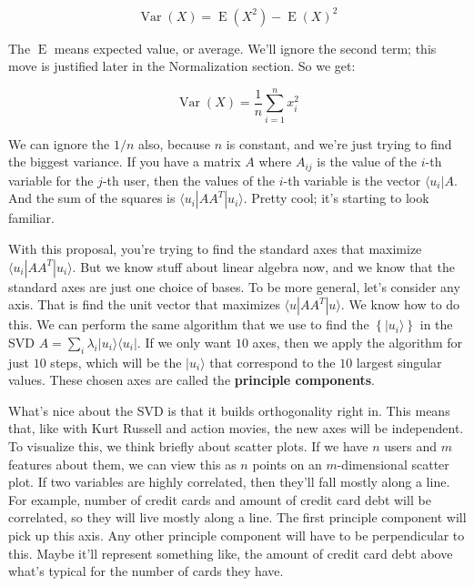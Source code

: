 \documentclass{amsbook}
\begin{document}
\begin{equation}
\label{var}
\operatorname{Var}(X) = \operatorname{E}(X^2) - \operatorname{E}(X)^2
\end{equation}

The $\operatorname{E}$ means expected value, or average.  We'll ignore the second term; this move is justified later in the Normalization section.  So we get:

$$
\operatorname{Var}(X) = \frac{1}{n}\sum_{i=1}^n x_i^2
$$

We can ignore the $1/n$ also, because $n$ is constant, and we're just trying to find the biggest variance.  If you have a matrix $A$ where $A_{ij}$ is the value of the $i$-th variable for the $j$-th user, then the values of the $i$-th variable is the vector $\langle u_i|A$.  And the sum of the squares is $\langle u_i|AA^T|u_i\rangle$.  Pretty cool; it's starting to look familiar.

With this proposal, you're trying to find the standard axes that maximize $\langle u_i|AA^T|u_i\rangle$.  But we know stuff about linear algebra now, and we know that the standard axes are just one choice of bases.  To be more general, let's consider any axis.  That is find the unit vector that maximizes $\langle u|AA^T|u\rangle$.  We know how to do this.  We can perform the same algorithm that we use to find the $\left\{|u_i\rangle\right\}$ in the SVD $A=\sum_i\lambda_i|u_i\rangle\langle u_i|$.  If we only want $10$ axes, then we apply the algorithm for just $10$ steps, which will be the $|u_i\rangle$ that correspond to the $10$ largest singular values.  These chosen axes are called the {\bf principle components}.

What's nice about the SVD is that it builds orthogonality right in.  This means that, like with Kurt Russell and action movies, the new axes will be independent.  To visualize this, we think briefly about scatter plots.  If we have $n$ users and $m$ features about them, we can view this as $n$ points on an $m$-dimensional scatter plot.  If two variables are highly correlated, then they'll fall mostly along a line.  For example, number of credit cards and amount of credit card debt will be correlated, so they will live mostly along a line.  The first principle component will pick up this axis.  Any other principle component will have to be perpendicular to this.  Maybe it'll represent something like, the amount of credit card debt above what's typical for the number of cards they have.
\end{document}
